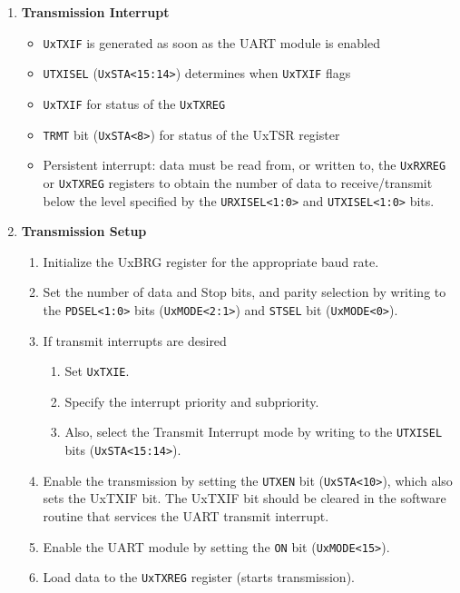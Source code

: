 \documentclass[a4paper]{article}
\begin{document}
\begin{enumerate}[label = \arabic*.]
    \item \textbf{Transmission Interrupt}
      \begin{itemize}[leftmargin = 0.5cm]
        \item \verb|UxTXIF| is generated as soon as the UART module is enabled
        \item \verb|UTXISEL| (\verb|UxSTA<15:14>|) determines when \verb|UxTXIF| flags
        \item \verb|UxTXIF| for status of the \verb|UxTXREG|
        \item \verb|TRMT| bit (\verb|UxSTA<8>|) for status of the UxTSR register
        \item Persistent interrupt: data must be read from, or written to, the \verb|UxRXREG| or \verb|UxTXREG| registers to obtain the number of data to receive/transmit below the level specified by the \verb|URXISEL<1:0>| and \verb|UTXISEL<1:0>| bits.
      \end{itemize}

    \item \textbf{Transmission Setup}
      \begin{enumerate}[label = \arabic*.]
        \item Initialize the UxBRG register for the appropriate baud rate.
        \item Set the number of data and Stop bits, and parity selection by writing to the \verb|PDSEL<1:0>| bits (\verb|UxMODE<2:1>|) and \verb|STSEL| bit (\verb|UxMODE<0>|).
        \item If transmit interrupts are desired
          \begin{enumerate}[label = \arabic*.]
            \item Set \verb|UxTXIE|.
            \item Specify the interrupt priority and subpriority.
            \item Also, select the Transmit Interrupt mode by writing to the \verb|UTXISEL| bits (\verb|UxSTA<15:14>|).
          \end{enumerate}
        \item Enable the transmission by setting the \verb|UTXEN| bit (\verb|UxSTA<10>|), which also sets the UxTXIF bit. The UxTXIF bit should be cleared in the software routine that services the UART transmit interrupt.
        \item Enable the UART module by setting the \verb|ON| bit (\verb|UxMODE<15>|).
        \item Load data to the \verb|UxTXREG| register (starts transmission).
      \end{enumerate}


\end{enumerate}
\end{document}
